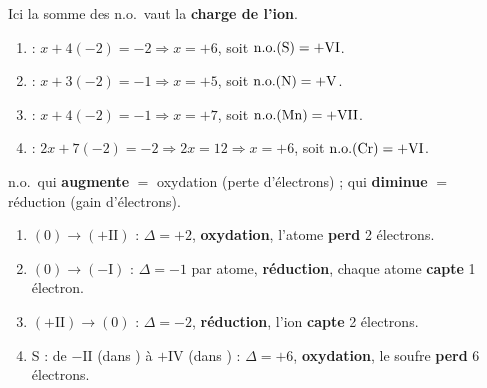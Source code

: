 \documentclass[11pt,a4paper]{article}
\begin{document}
\begin{corrige}
Ici la somme des n.o.\ vaut la \textbf{charge de l'ion}.
\begin{enumerate}[label=\alph*)]
  \item {} : $x+4(-2)=-2\Rightarrow x=+6$, soit $\mathrm{n.o.}(\ce{S})=+\mathrm{VI}$.
  \item {} : $x+3(-2)=-1\Rightarrow x=+5$, soit $\mathrm{n.o.}(\ce{N})=+\mathrm{V}$.
  \item {} : $x+4(-2)=-1\Rightarrow x=+7$, soit $\mathrm{n.o.}(\ce{Mn})=+\mathrm{VII}$.
  \item {} : $2x+7(-2)=-2\Rightarrow 2x=12\Rightarrow x=+6$, soit
        $\mathrm{n.o.}(\ce{Cr})=+\mathrm{VI}$.
\end{enumerate}
\end{corrige}

\begin{corrige}
n.o.\ qui \textbf{augmente} $=$ oxydation (perte d'électrons) ; qui \textbf{diminue} $=$ réduction
(gain d'électrons).
\begin{enumerate}[label=\alph*)]
  \item {}$(0)\to$$(+\mathrm{II})$ : $\Delta=+2$, \textbf{oxydation}, l'atome
        \textbf{perd} 2 électrons.
  \item {}$(0)\to$$(-\mathrm{I})$ : $\Delta=-1$ par atome, \textbf{réduction}, chaque
        atome \textbf{capte} 1 électron.
  \item {}$(+\mathrm{II})\to$$(0)$ : $\Delta=-2$, \textbf{réduction}, l'ion
        \textbf{capte} 2 électrons.
  \item S : de $-\mathrm{II}$ (dans ) à $+\mathrm{IV}$ (dans ) : $\Delta=+6$,
        \textbf{oxydation}, le soufre \textbf{perd} 6 électrons.
\end{enumerate}
\end{corrige}
\end{document}
